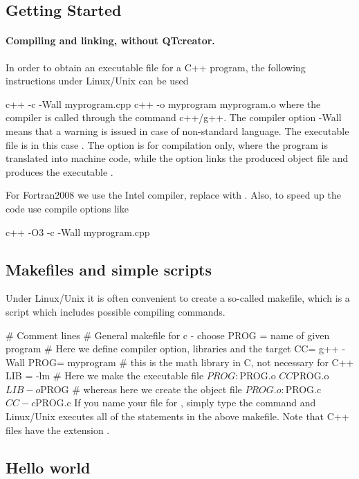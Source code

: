 \documentclass[%
twoside,                 %
final,                   %
10pt]{article}
\newenvironment{paragraphadmon}[1][]{\paragraph{#1}}{}
\begin{document}
\subsection{Getting Started}


\begin{paragraphadmon}[Compiling and linking, without QTcreator.]
In order to obtain an executable file for a C++ program, the following
instructions under Linux/Unix can be used

\bsys
c++ -c -Wall myprogram.cpp
c++ -o myprogram myprogram.o
\esys
where the compiler is called through the command c++/g++. The compiler
option -Wall means that a warning is issued in case of non-standard
language. The executable file is in this case . The option
 is for compilation only, where the program is translated into machine code,
while the  option links the produced object file 
and produces the executable  .

For Fortran2008 we use the Intel compiler, replace  with .
Also, to speed up the code use compile options like

\bsys
c++ -O3 -c -Wall myprogram.cpp
\esys
\end{paragraphadmon}



\subsection{Makefiles and simple scripts}

Under Linux/Unix it is often convenient to create a
so-called makefile, which is a script which includes possible
compiling commands.

\bcppcod
# Comment lines
# General makefile for c - choose PROG =   name of given program
# Here we define compiler option, libraries and the  target
CC= g++ -Wall
PROG= myprogram
# this is the math library in C, not necessary for C++
LIB = -lm
# Here we make the executable file
${PROG} :          ${PROG}.o
                   ${CC} ${PROG}.o ${LIB} -o ${PROG}
# whereas here we create the object file
${PROG}.o :       ${PROG}.c
                  ${CC} -c ${PROG}.c
\ecppcod
If you name your file for , simply type the command
 and Linux/Unix executes all of the statements in the above
makefile. Note that C++ files have the extension .

\subsection{Hello world}
\end{document}
